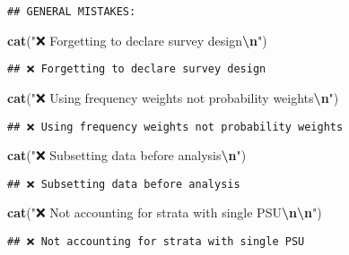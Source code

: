 \documentclass[
]{article}
\newenvironment{Shaded}{\begin{snugshade}}{\end{snugshade}}
\newcommand{\FunctionTok}[1]{\textcolor[rgb]{0.13,0.29,0.53}{\textbf{#1}}}
\newcommand{\NormalTok}[1]{#1}
\newcommand{\SpecialCharTok}[1]{\textcolor[rgb]{0.81,0.36,0.00}{\textbf{#1}}}
\newcommand{\StringTok}[1]{\textcolor[rgb]{0.31,0.60,0.02}{#1}}
\begin{document}
\begin{verbatim}
## GENERAL MISTAKES:
\end{verbatim}

\begin{Shaded}
\begin{Highlighting}[]
\FunctionTok{cat}\NormalTok{(}\StringTok{"❌ Forgetting to declare survey design}\SpecialCharTok{\textbackslash{}n}\StringTok{"}\NormalTok{)}
\end{Highlighting}
\end{Shaded}

\begin{verbatim}
## ❌ Forgetting to declare survey design
\end{verbatim}

\begin{Shaded}
\begin{Highlighting}[]
\FunctionTok{cat}\NormalTok{(}\StringTok{"❌ Using frequency weights not probability weights}\SpecialCharTok{\textbackslash{}n}\StringTok{"}\NormalTok{)}
\end{Highlighting}
\end{Shaded}

\begin{verbatim}
## ❌ Using frequency weights not probability weights
\end{verbatim}

\begin{Shaded}
\begin{Highlighting}[]
\FunctionTok{cat}\NormalTok{(}\StringTok{"❌ Subsetting data before analysis}\SpecialCharTok{\textbackslash{}n}\StringTok{"}\NormalTok{)}
\end{Highlighting}
\end{Shaded}

\begin{verbatim}
## ❌ Subsetting data before analysis
\end{verbatim}

\begin{Shaded}
\begin{Highlighting}[]
\FunctionTok{cat}\NormalTok{(}\StringTok{"❌ Not accounting for strata with single PSU}\SpecialCharTok{\textbackslash{}n\textbackslash{}n}\StringTok{"}\NormalTok{)}
\end{Highlighting}
\end{Shaded}

\begin{verbatim}
## ❌ Not accounting for strata with single PSU
\end{verbatim}
\end{document}

